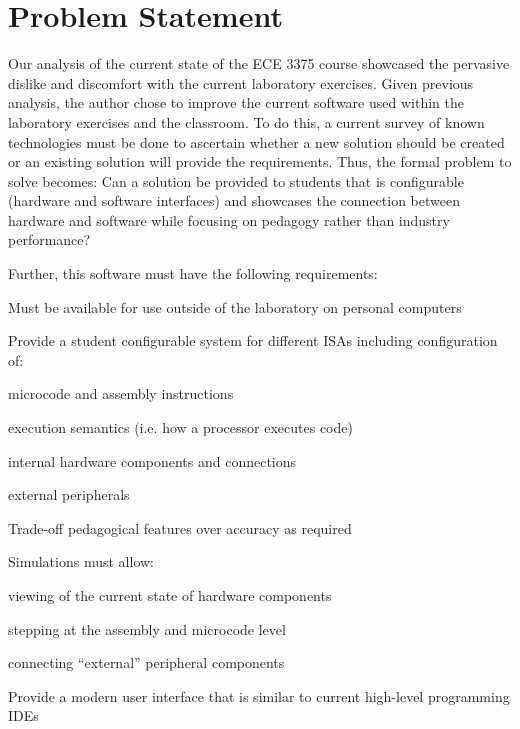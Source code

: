 \section{Problem Statement}
\label{sec:problem-statement}

Our analysis of the current state of the ECE 3375 course showcased the pervasive dislike and discomfort with the current laboratory exercises. Given previous analysis, the author chose to improve the current software used within the laboratory exercises and the classroom. To do this, a current survey of known technologies must be done to ascertain whether a new solution should be created or an existing solution will provide the requirements. Thus, the formal problem to solve becomes: Can a solution be provided to students that is configurable (hardware and software interfaces) and showcases the connection between hardware and software while focusing on pedagogy rather than industry performance? 

Further, this software must have the following requirements: 

\begin{requirements}
    \item\label{req:personal} Must be available for use outside of the laboratory on personal computers
        
    \item\label{req:configuration} Provide a student configurable system for different ISAs including configuration of:
        \begin{requirements}
            \item microcode and assembly instructions
            \item execution semantics (i.e. how a processor executes code)
            \item internal hardware components and connections
            \item external peripherals
        \end{requirements}
        
    \item\label{req:pedagogical} Trade-off pedagogical features over accuracy as required
       
    \item\label{req:simulations} Simulations must allow: 
        \begin{requirements}
            \item viewing of the current state of hardware components
            \item stepping at the assembly and microcode level
            \item connecting ``external'' peripheral components
        \end{requirements}
    
    \item \label{req:modern} Provide a modern user interface that is similar to current high-level programming IDEs
        
\end{requirements}

